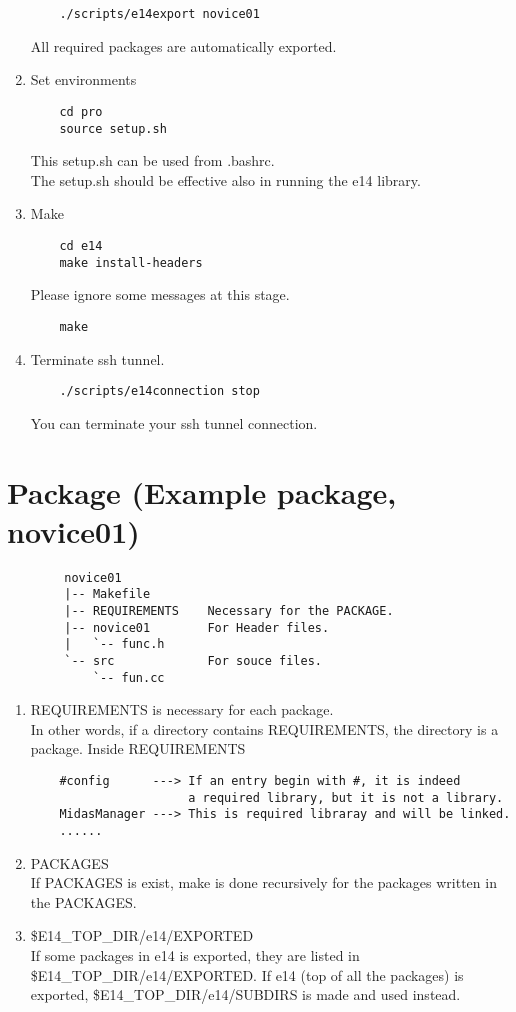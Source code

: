 \documentclass[a4paper,12pt]{article}
\begin{document}
\begin{enumerate}
	 \begin{verbatim}
	./scripts/e14export novice01
	 \end{verbatim}
	 All required packages are automatically exported.
   \item Set environments\\
	 \begin{verbatim}
	cd pro
	source setup.sh
	 \end{verbatim}
	 This setup.sh can be used from .bashrc.\\
	 The setup.sh should be effective also in running the e14 library.
   \item Make
	 \begin{verbatim}
	cd e14
	make install-headers
	 \end{verbatim}
	 Please ignore some messages at this stage.
	 \begin{verbatim}
	make
	 \end{verbatim}
   \item Terminate ssh tunnel.
	 \begin{verbatim}
	./scripts/e14connection stop
	 \end{verbatim}
	 You can terminate your ssh tunnel connection.
  \end{enumerate}
 \section{Package (Example package, novice01)}
   \begin{verbatim}
        novice01
        |-- Makefile        
        |-- REQUIREMENTS    Necessary for the PACKAGE.
        |-- novice01        For Header files.
        |   `-- func.h
        `-- src             For souce files.
            `-- fun.cc	
   \end{verbatim}
   \begin{enumerate}
    \item REQUIREMENTS is necessary for each package.\\
	  In other words, if a directory contains REQUIREMENTS,
	  the directory is a package.
	  Inside REQUIREMENTS
	  \begin{verbatim}
	#config      ---> If an entry begin with #, it is indeed
	                  a required library, but it is not a library.
	MidasManager ---> This is required libraray and will be linked.
	......
	  \end{verbatim}
    \item PACKAGES\\
          If PACKAGES is exist, make is done recursively for the packages
	  written in the PACKAGES.
    \item \$E14\_TOP\_DIR/e14/EXPORTED\\
	  If some packages in e14 is exported,
	  they are listed in \$E14\_TOP\_DIR/e14/EXPORTED.
          If e14 (top of all the packages) is exported,
	  \$E14\_TOP\_DIR/e14/SUBDIRS is made and
	  used instead.
   \end{enumerate}
\end{document}
